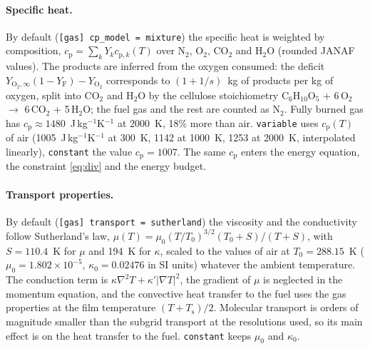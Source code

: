 \documentclass[11pt,a4paper]{article}
\newcommand{\code}[1]{\texttt{#1}}
\newcommand{\Yf}{Y_\text{F}}
\newcommand{\YO}{Y_{\mathrm{O_2}}}
\begin{document}
\paragraph{Specific heat.} By default (\code{[gas] cp\_model = mixture}) the specific heat is
weighted by composition, $c_\text{p}=\sum_kY_kc_{\text{p},k}(T)$ over N$_2$, O$_2$, CO$_2$ and H$_2$O (rounded JANAF
values). The products are inferred from the oxygen consumed: the deficit $Y_{\mathrm{O_2},\infty}(1-\Yf)-\YO$
corresponds to $(1+1/s)$~kg of products per kg of oxygen, split into CO$_2$ and H$_2$O by the cellulose
stoichiometry C$_6$H$_{10}$O$_5$ + 6\,O$_2$ $\to$ 6\,CO$_2$ + 5\,H$_2$O; the fuel gas and the rest are
counted as N$_2$. Fully burned gas has $c_\text{p}\approx1480$~J\,kg$^{-1}$K$^{-1}$ at 2000~K, 18\% more than
air. \code{variable} uses $c_\text{p}(T)$ of air (1005~J\,kg$^{-1}$K$^{-1}$ at 300~K, 1142 at 1000~K, 1253 at
2000~K, interpolated linearly), \code{constant} the value $c_\text{p}=1007$. The same $c_\text{p}$ enters the
energy equation, the constraint \eqref{eq:div} and the energy budget.

\paragraph{Transport properties.} By default (\code{[gas] transport = sutherland}) the viscosity and
the conductivity follow Sutherland's law, $\mu(T)=\mu_0(T/T_0)^{3/2}(T_0+S)/(T+S)$, with $S=110.4$~K for
$\mu$ and 194~K for $\kappa$, scaled to the values of air at $T_0=288.15$~K ($\mu_0=1.802\times10^{-5}$,
$\kappa_0=0.02476$ in SI units) whatever the ambient temperature. The conduction term is
$\kappa\nabla^2T+\kappa'|\nabla T|^2$, the gradient of $\mu$ is neglected in the momentum equation, and
the convective heat transfer to the fuel uses the gas properties at the film temperature
$(T+T_\text{s})/2$. Molecular transport is orders of magnitude smaller than the subgrid transport at the
resolutions used, so its main effect is on the heat transfer to the fuel. \code{constant} keeps
$\mu_0$ and $\kappa_0$.
\end{document}
